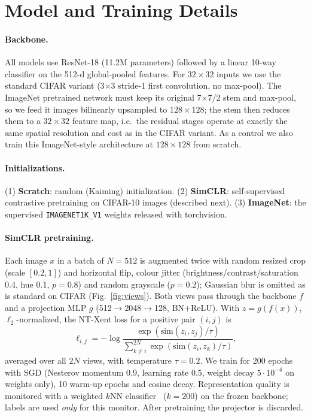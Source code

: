 \documentclass[10pt,a4paper]{article}
\begin{document}
\section{Model and Training Details}
\paragraph{Backbone.} All models use ResNet-18 (11.2M parameters) followed by a linear
10-way classifier on the 512-d global-pooled features. For $32\times32$ inputs we use the
standard CIFAR variant (3$\times$3 stride-1 first convolution, no max-pool). The ImageNet
pretrained network must keep its original 7$\times$7/2 stem and max-pool, so we feed it
images bilinearly upsampled to $128\times128$; the stem then reduces them to a
$32\times32$ feature map, i.e.\ the residual stages operate at exactly the same spatial
resolution and cost as in the CIFAR variant. As a control we also train this ImageNet-style
architecture at $128\times128$ from scratch.

\paragraph{Initializations.}
(1) \textbf{Scratch}: random (Kaiming) initialization.
(2) \textbf{SimCLR}: self-supervised contrastive pretraining on CIFAR-10 images (described next).
(3) \textbf{ImageNet}: the supervised \texttt{IMAGENET1K\_V1} weights released with torchvision.

\paragraph{SimCLR pretraining.}
Each image $x$ in a batch of $N=512$ is augmented twice with random resized crop
(scale $[0.2,1]$) and horizontal flip, colour jitter (brightness/contrast/saturation 0.4,
hue 0.1, $p=0.8$) and random grayscale ($p=0.2$); Gaussian blur is omitted as is standard on
CIFAR (Fig.~\ref{fig:views}). Both views pass through the backbone $f$ and a projection
MLP $g$ (512$\to$2048$\to$128, BN+ReLU). With $z=g(f(x))$, $\ell_2$-normalized, the NT-Xent loss for a
positive pair $(i,j)$ is
\begin{equation}
\ell_{i,j} = -\log \frac{\exp(\mathrm{sim}(z_i,z_j)/\tau)}{\sum_{k\neq i}^{2N}\exp(\mathrm{sim}(z_i,z_k)/\tau)},
\end{equation}
averaged over all $2N$ views, with temperature $\tau=0.2$. We train for 200 epochs with SGD
(Nesterov momentum 0.9, learning rate 0.5, weight decay $5\cdot10^{-4}$ on weights only),
10 warm-up epochs and cosine decay. Representation quality is monitored with a weighted
$k$NN classifier~\cite{knn} ($k=200$) on the frozen backbone; labels are used \emph{only} for this monitor.
After pretraining the projector is discarded.
\end{document}
